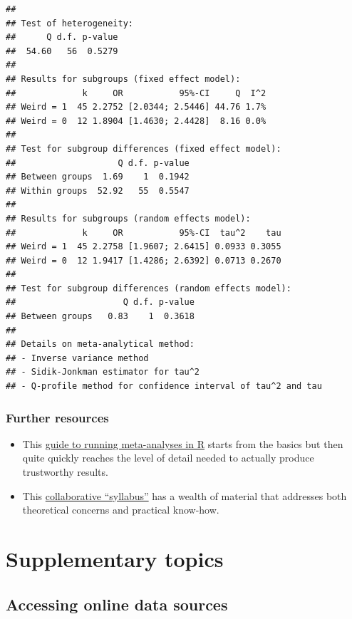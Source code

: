 \documentclass[
]{book}
\providecommand{\tightlist}{%
  \setlength{\itemsep}{0pt}\setlength{\parskip}{0pt}}
\begin{document}
\begin{verbatim}
## 
## Test of heterogeneity:
##      Q d.f. p-value
##  54.60   56  0.5279
## 
## Results for subgroups (fixed effect model):
##             k     OR           95%-CI     Q  I^2
## Weird = 1  45 2.2752 [2.0344; 2.5446] 44.76 1.7%
## Weird = 0  12 1.8904 [1.4630; 2.4428]  8.16 0.0%
## 
## Test for subgroup differences (fixed effect model):
##                    Q d.f. p-value
## Between groups  1.69    1  0.1942
## Within groups  52.92   55  0.5547
## 
## Results for subgroups (random effects model):
##             k     OR           95%-CI  tau^2    tau
## Weird = 1  45 2.2758 [1.9607; 2.6415] 0.0933 0.3055
## Weird = 0  12 1.9417 [1.4286; 2.6392] 0.0713 0.2670
## 
## Test for subgroup differences (random effects model):
##                     Q d.f. p-value
## Between groups   0.83    1  0.3618
## 
## Details on meta-analytical method:
## - Inverse variance method
## - Sidik-Jonkman estimator for tau^2
## - Q-profile method for confidence interval of tau^2 and tau
\end{verbatim}

\hypertarget{further-resources-meta}{%
\section{Further resources}\label{further-resources-meta}}

\begin{itemize}
\tightlist
\item
  This \href{https://bookdown.org/MathiasHarrer/Doing_Meta_Analysis_in_R/}{guide to running meta-analyses in R} starts from the basics but then quite quickly reaches the level of detail needed to actually produce trustworthy results.
\item
  This \href{http://mgto.org/metaanalysissyllabus}{collaborative ``syllabus''} has a wealth of material that addresses both theoretical concerns and practical know-how.
\end{itemize}

\hypertarget{part-supplementary-topics}{%
\part*{Supplementary topics}\label{part-supplementary-topics}}

\hypertarget{accessing-online-data-sources}{%
\chapter{Accessing online data sources}\label{accessing-online-data-sources}}
\end{document}
